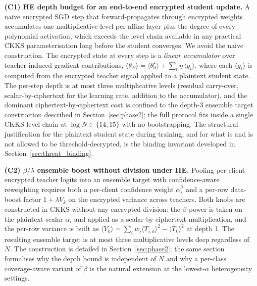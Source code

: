 \par\noindent\textbf{(C1) HE depth budget for an end-to-end encrypted student update.} A naive encrypted SGD step that forward-propagates through encrypted weights accumulates one multiplicative level per affine layer plus the degree of every polynomial activation, which exceeds the level chain available in any practical CKKS parameterisation long before the student converges. We avoid the naive construction. The encrypted state at every step is a \emph{linear accumulator} over teacher-induced gradient contributions, $\langle\theta_E\rangle = \langle\theta_0^\star\rangle + \sum_t \eta\,\langle g_t\rangle$, where each $\langle g_t\rangle$ is computed from the encrypted teacher signal applied to a plaintext student state. The per-step depth is at most three multiplicative levels (residual carry-over, scalar-by-ciphertext for the learning rate, addition to the accumulator), and the dominant ciphertext-by-ciphertext cost is confined to the depth-3 ensemble target construction described in Section~\ref{sec:phase2}; the full protocol fits inside a single CKKS level chain at $\log N \in \{14, 15\}$ with no bootstrapping. The structural justification for the plaintext student state during training, and for what is and is not allowed to be threshold-decrypted, is the binding invariant developed in Section~\ref{sec:threat_binding}.

\par\noindent\textbf{(C2) $\beta/\lambda$ ensemble boost without division under HE.} Pooling per-client encrypted teacher logits into an ensemble target with confidence-aware reweighting requires both a per-client confidence weight $\alpha_i^\beta$ and a per-row data-boost factor $1+\lambda V_k$ on the encrypted variance across teachers. Both knobs are constructed in CKKS without any encrypted division: the $\beta$-power is taken on the plaintext scalar $\alpha_i$ and applied as a scalar-by-ciphertext multiplication, and the per-row variance is built as $\langle V_k\rangle = \sum_i w_i \langle T_{i,k}\rangle^2 - \langle\bar T_k\rangle^2$ at depth 1. The resulting ensemble target is at most three multiplicative levels deep regardless of $N$. The construction is detailed in Section~\ref{sec:phase2}; the same section formalises why the depth bound is independent of $N$ and why a per-class coverage-aware variant of $\beta$ is the natural extension at the lowest-$\alpha$ heterogeneity settings.

